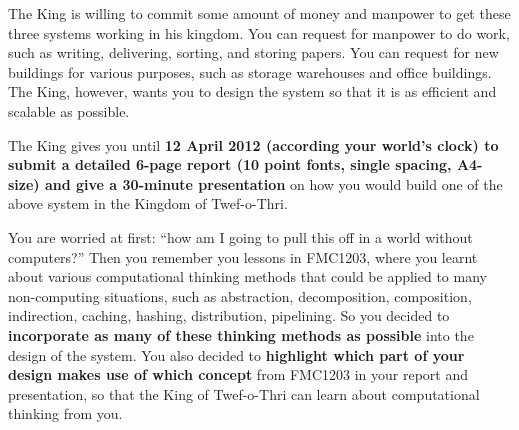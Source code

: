 \documentclass[answers,a4paper,11pt]{exam}
\begin{document}
The King is willing to commit some amount of money and manpower to get these three systems working in his kingdom.  You can request for manpower to do work, such as writing, delivering, sorting, and storing papers.  You can request for new buildings for various purposes, such as storage warehouses and office buildings.  The King, however, wants you to design the system so that it is as efficient and scalable as possible.

The King gives you until \textbf{12 April 2012 (according your world’s clock) to submit a detailed 6-page report (10 point fonts, single spacing, A4-size) and give a 30-minute presentation} on how you would build one of the above system in the Kingdom of Twef-o-Thri.   

You are worried at first: ``how am I going to pull this off in a world without computers?''  Then you remember you lessons in FMC1203, where you learnt about various computational thinking methods that could be applied to many non-computing situations, such as abstraction, decomposition, composition, indirection, caching, hashing, distribution, pipelining.  So you decided to \textbf{incorporate as many of these thinking methods as possible} into the design of the system.  You also decided to \textbf{highlight which part of your design makes use of which concept} from FMC1203 in your report and presentation, so that the King of Twef-o-Thri can learn about computational thinking from you. 
\end{document}
